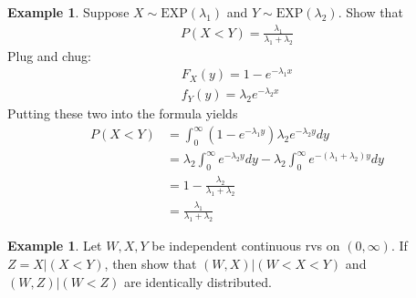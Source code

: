 \documentclass[11pt]{amsart}
\theoremstyle{definition}
\newtheorem{example}[theorem]{Example}
\numberwithin{equation}{section}
\begin{document}
 \begin{example}\label{expex}
     Suppose $X\sim\mathrm{EXP}(\lambda_1)$ and $Y\sim\mathrm{EXP}(\lambda_2)$. Show that
     \begin{align*}
         P(X<Y)=\frac{\lambda_1}{\lambda_1+\lambda_2}
     \end{align*}
     Plug and chug:
     \begin{align*}
         F_X(y)=1-e^{-\lambda_1 x}\\
         f_Y(y)=\lambda_2e^{-\lambda_2 x}
     \end{align*}
     Putting these two into the formula yields
     \begin{align*}
         P(X<Y)&=\int_{0}^{\infty}(1-e^{-\lambda_1 y})\lambda_2e^{-\lambda_2 y}dy\\
         &=\lambda_2\int_0^\infty e^{-\lambda_2 y}dy-\lambda_2\int_0^\infty e^{-(\lambda_1+\lambda_2)y}dy\\
         &=1-\frac{\lambda_2}{\lambda_1+\lambda_2}\\
         &=\frac{\lambda_1}{\lambda_1+\lambda_2}
     \end{align*}
 \end{example}
 \begin{example}
     Let $W,X,Y$ be independent continuous rvs on $(0,\infty)$. If $Z=X|(X<Y)$, then show that $(W,X)|(W<X<Y)$ and $(W,Z)|(W<Z)$ are identically distributed.
 \end{example}
 \addtocounter{theorem}{-1}
\end{document}
